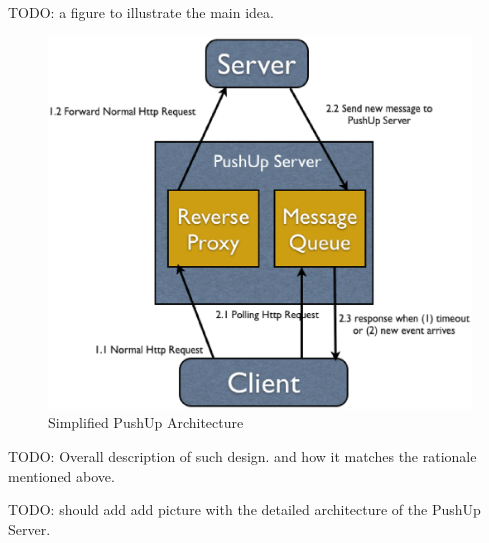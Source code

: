 TODO: a figure to illustrate the main idea.

\begin{figure}[htb!]
\centering%
    \includegraphics[scale=0.40]{figures/simple_pushup_arch.eps}
    \caption{Simplified PushUp Architecture}
    \label{fig:eventloop}
\end{figure}

TODO: Overall description of such design. and how it matches the rationale mentioned above.

TODO: should add add picture with the detailed architecture of the PushUp Server.

